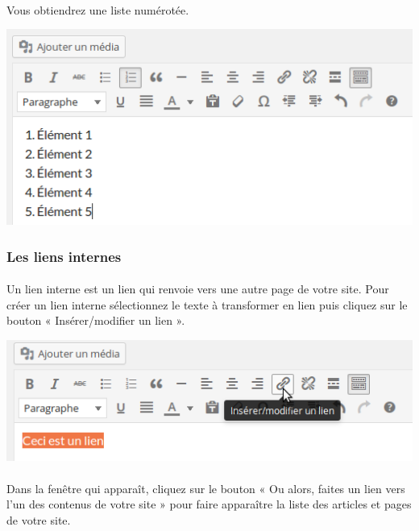 \documentclass[10pt,a4paper]{article}
\begin{document}
\paragraph{}Vous obtiendrez une liste numérotée.
\begin{center}
\includegraphics[scale=0.35]{img/0076.png}
\end{center}
\subsubsection{Les liens internes}
\paragraph{}Un lien interne est un lien qui renvoie vers une autre page de votre site. Pour créer un lien interne sélectionnez le texte à transformer en lien puis cliquez sur le bouton « Insérer/modifier un lien ».
\begin{center}
\includegraphics[scale=0.35]{img/0077.png}
\end{center}
\paragraph{}Dans la fenêtre qui apparaît, cliquez sur le bouton « Ou alors, faites un lien vers l'un des contenus de votre site » pour faire apparaître la liste des articles et pages de votre site.
\end{document}
